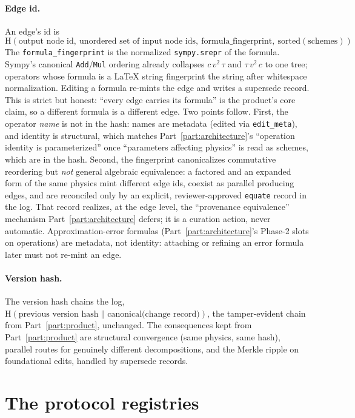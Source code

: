 \documentclass[11pt,a4paper]{article}
\begin{document}
\paragraph{Edge id.} An edge's id is
\[
  \mathrm{H}(\text{output node id},\ \text{unordered set of input node ids},\ \text{formula\_fingerprint},\ \mathrm{sorted}(\text{schemes})).
\]
The \texttt{formula\_fingerprint} is the normalized \texttt{sympy.srepr} of the
formula. Sympy's canonical \texttt{Add}/\texttt{Mul} ordering already collapses
$c\,v^2\,\tau$ and $\tau\,v^2\,c$ to one tree; operators whose formula is a LaTeX
string fingerprint the string after whitespace normalization. Editing a formula
re-mints the edge and writes a supersede record. This is strict but honest: ``every
edge carries its formula'' is the product's core claim, so a different formula is a
different edge. Two points follow. First, the operator \emph{name} is not in the
hash: names are metadata (edited via \texttt{edit\_meta}), and identity is
structural, which matches Part~\ref{part:architecture}'s ``operation identity is
parameterized'' once ``parameters affecting physics'' is read as schemes, which
are in the hash. Second, the fingerprint canonicalizes commutative reordering but
\emph{not} general algebraic equivalence: a factored and an expanded form of the
same physics mint different edge ids, coexist as parallel producing edges, and are
reconciled only by an explicit, reviewer-approved \texttt{equate} record in the
log. That record realizes, at the edge level, the ``provenance equivalence''
mechanism Part~\ref{part:architecture} defers; it is a curation action, never
automatic. Approximation-error formulas (Part~\ref{part:architecture}'s Phase-2
slots on operations) are metadata, not identity: attaching or refining an error
formula later must not re-mint an edge.

\paragraph{Version hash.} The version hash chains the log,
$\mathrm{H}(\text{previous version hash} \parallel \text{canonical(change record)})$,
the tamper-evident chain from Part~\ref{part:product}, unchanged. The consequences
kept from Part~\ref{part:product} are structural convergence (same physics, same
hash), parallel routes for genuinely different decompositions, and the Merkle
ripple on foundational edits, handled by supersede records.

\section{The protocol registries}
\label{sec:kernel-registries}
\end{document}
